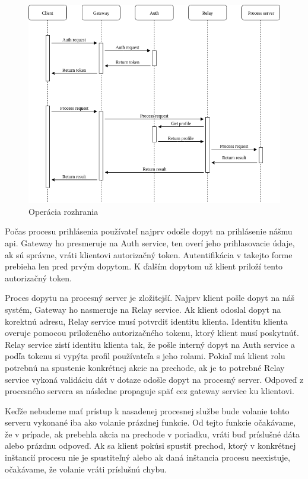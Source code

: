 \begin{figure}[!htbp]
	\centering
	\includegraphics[width=14cm]{img/api_operation.png}
	\caption{Operácia rozhrania}
	\label{api_operation}
\end{figure}

Počas procesu prihlásenia používateľ najprv odošle dopyt na prihlásenie nášmu \acrshort{api}.  Gateway ho presmeruje na Auth service, ten overí jeho prihlasovacie údaje, ak sú správne, vráti klientovi autorizačný token. Autentifikácia v takejto forme prebieha len pred prvým dopytom. K ďalším dopytom už klient priloží tento autorizačný token. 

Proces dopytu na procesný server je zložitejší. Najprv klient pošle dopyt na náš systém, Gateway ho nasmeruje na Relay service. Ak klient odoslal dopyt na korektnú adresu, Relay service musí potvrdiť identitu klienta. Identitu klienta overuje pomocou priloženého autorizačného tokenu, ktorý klient musí poskytnúť. Relay service zistí identitu klienta tak, že pošle interný dopyt na  Auth service a podľa tokenu si vypýta profil používateľa s jeho rolami.  Pokiaľ má klient rolu potrebnú na spustenie konkrétnej akcie na prechode, ak je to potrebné Relay service vykoná validáciu dát  v dotaze odošle dopyt na procesný server.  Odpoveď z procesného servera sa následne propaguje späť cez gateway service ku klientovi.
 
Keďže nebudeme mať prístup k nasadenej procesnej službe bude volanie tohto serveru vykonané iba ako volanie prázdnej funkcie. Od tejto funkcie očakávame, že v prípade, ak prebehla akcia na prechode v poriadku, vráti buď príslušné dáta alebo prázdnu odpoveď.  Ak sa klient pokúsi spustiť prechod, ktorý v konkrétnej inštancií procesu nie je spustiteľný alebo ak daná inštancia procesu neexistuje, očakávame, že volanie vráti príslušnú chybu. 

